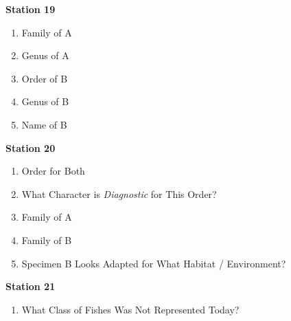 \textbf{Station 19}

\begin{enumerate}
\def\labelenumi{\arabic{enumi}.}
\setcounter{enumi}{89}
\item
  Family of A
\item
  Genus of A
\item
  Order of B
\item
  Genus of B
\item
  Name of B
\end{enumerate}

\textbf{Station 20}

\begin{enumerate}
\def\labelenumi{\arabic{enumi}.}
\setcounter{enumi}{94}
\item
  Order for Both
\item
  What Character is \emph{Diagnostic} for This Order?
\item
  Family of A
\item
  Family of B
\item
  Specimen B Looks Adapted for What Habitat / Environment?
\end{enumerate}

\textbf{Station 21}

\begin{enumerate}
\def\labelenumi{\arabic{enumi}.}
\setcounter{enumi}{99}
\item
  What Class of Fishes Was Not Represented Today?
\end{enumerate}
